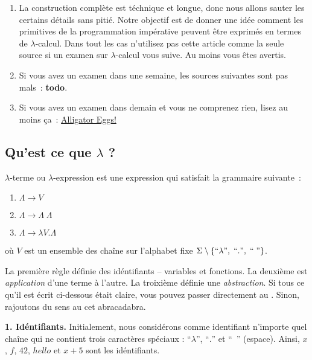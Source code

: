 \begin{remark}
	$\quad$
	\begin{enumerate}
		\item
			La construction complète est téchnique et longue, donc nous allons sauter les certains détails sans pitié. Notre objectif est de donner une idée comment les primitives de la programmation impérative peuvent être exprimés en termes de $\lambda$-calcul. Dans tout les cas n'utilisez pas cette article comme la seule source si un examen sur $\lambda$-calcul vous suive. Au moins vous êtes avertis.
		\item
			Si vous avez un examen dans une semaine, les sources suivantes sont pas mals~: \textbf{todo}.
		\item
			Si vous avez un examen dans demain et vous ne comprenez rien, lisez au moins ça~: \href{http://worrydream.com/AlligatorEggs/}{Alligator Eggs!}
	\end{enumerate}
\end{remark}

\subsection*{Qu'est ce que $\lambda$ ?}
\begin{definition}
	$\lambda$-terme ou $\lambda$-expression est une expression qui satisfait la grammaire suivante~:
	\begin{enumerate}
		\item $\Lambda \to V$
		\item $\Lambda \to \Lambda \; \Lambda$
		\item $\Lambda \to \lambda V. \Lambda$
	\end{enumerate}
	où $V$ est un ensemble des chaîne sur l'alphabet fixe $\Sigma \setminus \{``\lambda", \; ``.", \; ``\;"\}$.
\end{definition}
La première règle définie des idéntifiants -- variables et fonctions.
La deuxième est \emph{application} d'une terme à l'autre.
La troixième définie une \emph{abstraction}.
Si tous ce qu'il est écrit ci-dessous était claire, vous pouvez passer directement au .
Sinon, rajoutons du sens au cet abracadabra.


\textbf{1. Idéntifiants.} Initialement, nous considérons comme identifiant n'importe quel chaîne qui ne contient trois caractères spéciaux : ``$\lambda$'', ``$.$'' et ``~'' (espace).
Ainsi, $x$, $f$, $42$, $hello$ et $x+5$ sont les idéntifiants.

